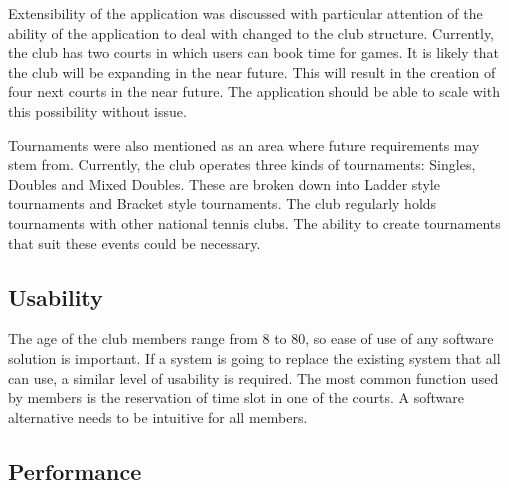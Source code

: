 Extensibility of the application was discussed with particular attention of the ability of the application to deal with changed to the club structure. Currently, the club has two courts in which users can book time for games. It is likely that the club will be expanding in the near future. This will result in the creation of four next courts in the near future. The application should be able to scale with this possibility without issue.

Tournaments were also mentioned as an area where future requirements may stem from. Currently, the club operates three kinds of tournaments: Singles, Doubles and Mixed Doubles. These are broken down into Ladder style tournaments and Bracket style tournaments. The club regularly holds tournaments with other national tennis clubs. The ability to create tournaments that suit these events could be necessary.

\subsection{Usability}

The age of the club members range from 8 to 80, so ease of use of any software solution is important. If a system is going to replace the existing system that all can use, a similar level of usability is required. The most common function used by members is the reservation of time slot in one of the courts. A software alternative needs to be intuitive for all members.

\subsection{Performance}

